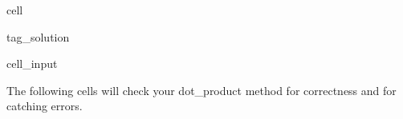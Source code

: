 \documentclass[letterpaper,10pt,english]{jupyterBook}
\begin{document}
\begin{sphinxuseclass}{cell}
\begin{sphinxuseclass}{tag_solution}\begin{sphinxVerbatimInput}

\begin{sphinxuseclass}{cell_input}
\begin{sphinxVerbatim}[commandchars=\\\{\}]
\end{sphinxVerbatim}

\end{sphinxuseclass}\end{sphinxVerbatimInput}

\end{sphinxuseclass}
\end{sphinxuseclass}
\sphinxAtStartPar
The following cells will check your dot\_product method for correctness and for catching errors.
\end{document}
